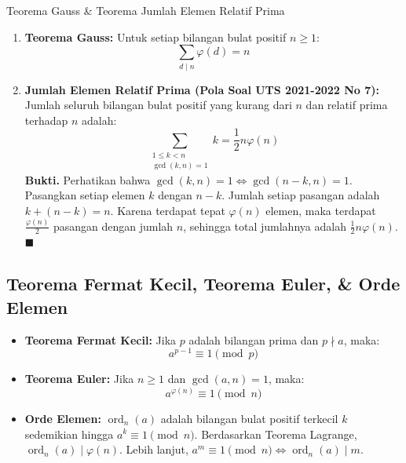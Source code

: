 \documentclass[11pt,a4paper]{article}
\newenvironment{proof}{\noindent\textbf{Bukti.}}{\hfill$\blacksquare$\vspace{0.3em}}
\begin{document}
\begin{thmbox}{Teorema Gauss \& Teorema Jumlah Elemen Relatif Prima}
\begin{enumerate}[leftmargin=*]
    \item \textbf{Teorema Gauss:} Untuk setiap bilangan bulat positif $n \ge 1$:
    \[
    \sum_{d \mid n} \varphi(d) = n
    \]
    \item \textbf{Jumlah Elemen Relatif Prima (Pola Soal UTS 2021-2022 No 7):} Jumlah seluruh bilangan bulat positif yang kurang dari $n$ dan relatif prima terhadap $n$ adalah:
    \[
    \sum_{\substack{1 \le k < n \\ \gcd(k, n) = 1}} k = \frac{1}{2} n \varphi(n)
    \]
    \begin{proof}
    Perhatikan bahwa $\gcd(k, n) = 1 \iff \gcd(n - k, n) = 1$. Pasangkan setiap elemen $k$ dengan $n - k$. Jumlah setiap pasangan adalah $k + (n - k) = n$. Karena terdapat tepat $\varphi(n)$ elemen, maka terdapat $\frac{\varphi(n)}{2}$ pasangan dengan jumlah $n$, sehingga total jumlahnya adalah $\frac{1}{2} n \varphi(n)$.
    \end{proof}
\end{enumerate}
\end{thmbox}

\subsection{Teorema Fermat Kecil, Teorema Euler, \& Orde Elemen}
\begin{itemize}[leftmargin=*]
    \item \textbf{Teorema Fermat Kecil:} Jika $p$ adalah bilangan prima dan $p \nmid a$, maka:
    \[
    a^{p-1} \equiv 1 \pmod p
    \]
    \item \textbf{Teorema Euler:} Jika $n \ge 1$ dan $\gcd(a, n) = 1$, maka:
    \[
    a^{\varphi(n)} \equiv 1 \pmod n
    \]
    \item \textbf{Orde Elemen:} $\operatorname{ord}_n(a)$ adalah bilangan bulat positif terkecil $k$ sedemikian hingga $a^k \equiv 1 \pmod n$. Berdasarkan Teorema Lagrange, $\operatorname{ord}_n(a) \mid \varphi(n)$. Lebih lanjut, $a^m \equiv 1 \pmod n \iff \operatorname{ord}_n(a) \mid m$.
\end{itemize}
\end{document}
